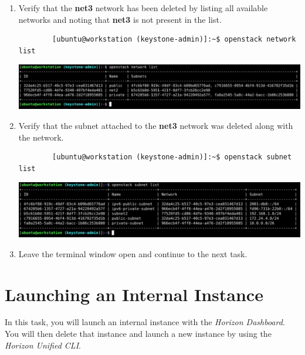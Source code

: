 \documentclass[letterpaper, 12pt]{article}
\begin{document}
\begin{enumerate}
    \item Verify that the \textbf{net3} network has been deleted by listing all available networks and noting that \textbf{net3} is not present in the list.
    \begin{lstlisting}
        [ubuntu@workstation (keystone-admin)]:~$ openstack network list
    \end{lstlisting}

    \begin{center}
        \includegraphics[width=\linewidth]{images/part3/step25.png}
    \end{center}

    \item Verify that the subnet attached to the \textbf{net3} network was deleted along with the network.
    \begin{lstlisting}
        [ubuntu@workstation (keystone-admin)]:~$ openstack subnet list
    \end{lstlisting}

    \begin{center}
        \includegraphics[width=\linewidth]{images/part3/step26.png}
    \end{center}

    \item Leave the terminal window open and continue to the next task.

\end{enumerate}

\section{Launching an Internal Instance}
\label{sec:launching_an_internal_instance}
In this task, you will launch an internal instance with the \textit{Horizon Dashboard}.
You will then delete that instance and launch a new instance by using the \textit{Horizon Unified CLI}.
\end{document}

